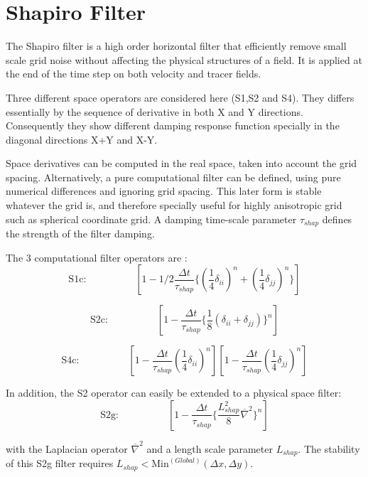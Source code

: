 
\section{Shapiro Filter} 
\label{sect:shapiro-filter}

The Shapiro filter \cite{Shapiro_70} is a high order horizontal 
filter that efficiently remove small scale grid noise 
without affecting the physical structures of a field. 
It is applied at the end of the time step %
on both velocity and tracer fields.

Three different space operators are considered here (S1,S2 and S4).
They differs essentially by the sequence of derivative in
both X and Y directions. Consequently they show different 
damping response function specially in the diagonal directions 
X+Y and X-Y.

Space derivatives can be computed in the real space, 
taken into account the grid spacing. 
Alternatively, a pure computational filter can be defined,
using pure numerical differences and ignoring 
grid spacing. 
This later form is stable whatever the grid is, and therefore
specially useful for highly anisotropic grid such as spherical 
coordinate grid.
A damping time-scale parameter $\tau_{shap}$ 
defines the strength of the filter damping.

The 3 computational filter operators are :
$$
\mathrm{S1c:}\hspace{2cm}
[1 - 1/2 \frac{\Delta t}{\tau_{shap}}
   \{ (\frac{1}{4}\delta_{ii})^n 
    + (\frac{1}{4}\delta_{jj})^n \} ] 
$$

$$
\mathrm{S2c:}\hspace{2cm}
[1 - \frac{\Delta t}{\tau_{shap}} 
\{ \frac{1}{8} (\delta_{ii} + \delta_{jj}) \}^n]
$$

$$
\mathrm{S4c:}\hspace{2cm}
[1 - \frac{\Delta t}{\tau_{shap}} (\frac{1}{4}\delta_{ii})^n]
[1 - \frac{\Delta t}{\tau_{shap}} (\frac{1}{4}\delta_{jj})^n]
$$

In addition, the S2 operator can easily be extended to 
a physical space filter: 
$$
\mathrm{S2g:}\hspace{2cm}
[1 - \frac{\Delta t}{\tau_{shap}} 
\{ \frac{L_{shap}^2}{8} \overline{\nabla}^2 \}^n]
$$

with the Laplacian operator $\overline{\nabla}^2 $
and a length scale parameter $L_{shap}$.
The stability of this S2g filter requires 
$L_{shap} < \mathrm{Min}^{(Global)}(\Delta x,\Delta y)$.

